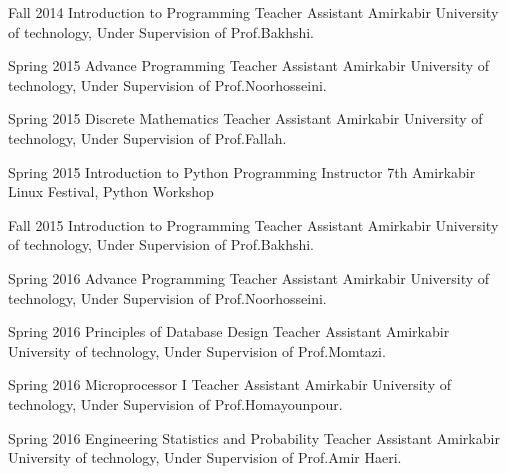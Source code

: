 \documentclass[]{friggeri-cv} %
\begin{document}
\begin{entrylist}

\entry
{Fall 2014}
{Introduction to Programming}
{Teacher Assistant}
{Amirkabir University of technology, Under Supervision of Prof.Bakhshi.}


\entry
{Spring 2015}
{Advance Programming}
{Teacher Assistant}
{Amirkabir University of technology, Under Supervision of Prof.Noorhosseini.}


\entry
{Spring 2015}
{Discrete Mathematics}
{Teacher Assistant}
{Amirkabir University of technology, Under Supervision of Prof.Fallah.}


\entry
{Spring 2015}
{Introduction to Python Programming}
{Instructor}
{7th Amirkabir Linux Festival, Python Workshop}



\entry
{Fall 2015}
{Introduction to Programming}
{Teacher Assistant}
{Amirkabir University of technology, Under Supervision of Prof.Bakhshi.}


\entry
{Spring 2016}
{Advance Programming}
{Teacher Assistant}
{Amirkabir University of technology, Under Supervision of Prof.Noorhosseini.}


\entry
{Spring 2016}
{Principles of Database Design}
{Teacher Assistant}
{Amirkabir University of technology, Under Supervision of Prof.Momtazi.}


\entry
{Spring 2016}
{Microprocessor I}
{Teacher Assistant}
{Amirkabir University of technology, Under Supervision of Prof.Homayounpour.}


\entry
{Spring 2016}
{Engineering Statistics and Probability}
{Teacher Assistant}
{Amirkabir University of technology, Under Supervision of Prof.Amir Haeri.}



\end{entrylist}
\end{document}
